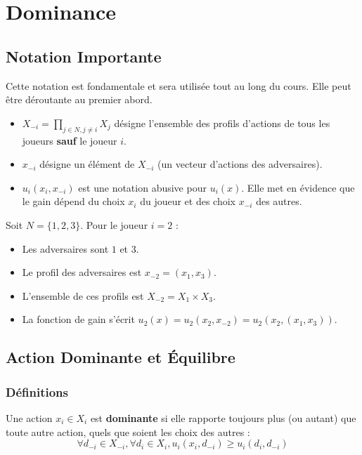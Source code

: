 \chapter{Dominance}

\section{Notation Importante}
Cette notation est fondamentale et sera utilisée tout au long du cours. Elle peut être déroutante au premier abord.

\begin{itemize}
    \item $X_{-i} = \prod_{j \in N, j \ne i} X_j$ désigne l'ensemble des profils d'actions de tous les joueurs \textbf{sauf} le joueur $i$.
    \item $x_{-i}$ désigne un élément de $X_{-i}$ (un vecteur d'actions des adversaires).
    \item $u_i(x_i, x_{-i})$ est une notation abusive pour $u_i(x)$. Elle met en évidence que le gain dépend du choix $x_i$ du joueur et des choix $x_{-i}$ des autres.
\end{itemize}

\begin{exemple}
Soit $N = \{1, 2, 3\}$. Pour le joueur $i=2$ :
\begin{itemize}
    \item Les adversaires sont $1$ et $3$.
    \item Le profil des adversaires est $x_{-2} = (x_1, x_3)$.
    \item L'ensemble de ces profils est $X_{-2} = X_1 \times X_3$.
    \item La fonction de gain s'écrit $u_2(x) = u_2(x_2, x_{-2}) = u_2(x_2, (x_1, x_3))$.
\end{itemize}
\end{exemple}

\section{Action Dominante et Équilibre}

\subsection{Définitions}
\begin{definition}
Une action $x_i \in X_i$ est \textbf{dominante} si elle rapporte toujours plus (ou autant) que toute autre action, quels que soient les choix des autres :
$$\forall d_{-i} \in X_{-i}, \forall d_i \in X_i, u_i(x_i, d_{-i}) \ge u_i(d_i, d_{-i})$$
\end{definition}

